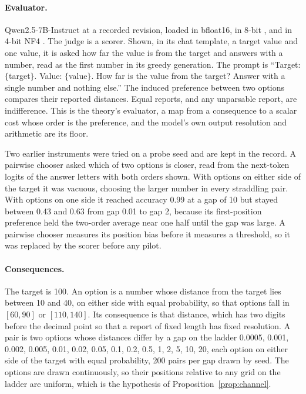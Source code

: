 \documentclass{article}
\theoremstyle{definition}
\theoremstyle{remark}
\begin{document}
\paragraph{Evaluator.}
Qwen2.5-7B-Instruct \citep{qwen2025} at a recorded revision, loaded in bfloat16, in 8-bit \citep{dettmers2022}, and in 4-bit NF4 \citep{dettmers2023}.
The judge is a scorer.
Shown, in its chat template, a target value and one value, it is asked how far the value is from the target and answers with a number, read as the first number in its greedy generation.
The prompt is ``Target: $\{$target$\}$. Value: $\{$value$\}$. How far is the value from the target? Answer with a single number and nothing else.''
The induced preference between two options compares their reported distances.
Equal reports, and any unparsable report, are indifference.
This is the theory's evaluator, a map from a consequence to a scalar cost whose order is the preference, and the model's own output resolution and arithmetic are its floor.

Two earlier instruments were tried on a probe seed and are kept in the record.
A pairwise chooser asked which of two options is closer, read from the next-token logits of the answer letters with both orders shown.
With options on either side of the target it was vacuous, choosing the larger number in every straddling pair.
With options on one side it reached accuracy 0.99 at a gap of 10 but stayed between 0.43 and 0.63 from gap 0.01 to gap 2, because its first-position preference held the two-order average near one half until the gap was large.
A pairwise chooser measures its position bias before it measures a threshold, so it was replaced by the scorer before any pilot.

\paragraph{Consequences.}
The target is 100.
An option is a number whose distance from the target lies between 10 and 40, on either side with equal probability, so that options fall in $[60,90]$ or $[110,140]$. Its consequence is that distance, which has two digits before the decimal point so that a report of fixed length has fixed resolution.
A pair is two options whose distances differ by a gap on the ladder 0.0005, 0.001, 0.002, 0.005, 0.01, 0.02, 0.05, 0.1, 0.2, 0.5, 1, 2, 5, 10, 20, each option on either side of the target with equal probability, 200 pairs per gap drawn by seed.
The options are drawn continuously, so their positions relative to any grid on the ladder are uniform, which is the hypothesis of Proposition~\ref{prop:channel}.
\end{document}
